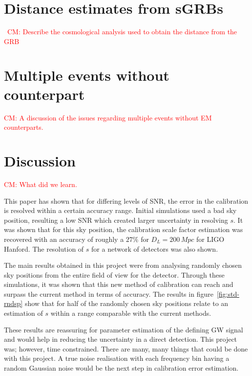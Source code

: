 \documentclass[10pt]{iopart}
\newcommand{\cm}[1]{\textcolor{red}{CM: #1}}
\begin{document}
\section{Distance estimates from \acp{sGRB}\label{sec:cosmo}}

~\cm{Describe the cosmological analysis used to obtain the distance from the
GRB}

\section{Multiple events without counterpart\label{sec:multiple}}

\cm{A discussion of the issues regarding multiple events
without EM counterparts.}

\section{Discussion\label{sec:discussion}}

\cm{What did we learn.}

This paper has shown that for differing levels of SNR, the error in the
calibration is resolved within a certain accuracy range. Initial simulations
used a bad sky position, resulting a low SNR which created larger uncertainty
in resolving $s$. It was shown that for this sky position, the calibration
scale factor estimation was recovered with an accuracy of roughly a $27\%$ for
$D_{L} = 200\,Mpc$ for LIGO Hanford. The resolution of $s$ for a network of
detectors was also shown.

The main results obtained in this project were from analysing randomly chosen
sky positions from the entire field of view for the detector. Through these
simulations, it was shown that this new method of calibration can reach and
surpass the current method in terms of accuracy. The results in
figure~\ref{fig:std-rndsp} show that for half of the randomly chosen sky
positions relate to an estimation of $s$ within a range comparable with the
current methods.

These results are reassuring for parameter estimation of the defining GW signal
and would help in reducing the uncertainty in a direct detection. This project
was; however, time constrained. There are many, many things that could be done
with this project. A true noise realisation with each frequency bin having a
random Gaussian noise would be the next step in calibration error estimation.
\end{document}
